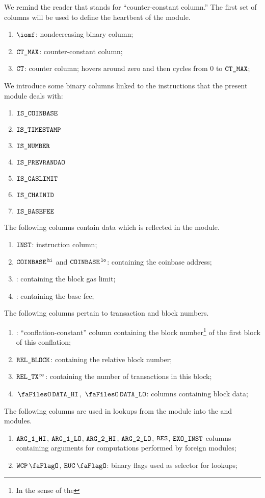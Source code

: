 We remind the reader that \ccc{} stands for ``counter-constant column.''
The first set of columns will be used to define the heartbeat of the \btcMod{} module.
\begin{enumerate}
	\item $\iomf$:
		nondecreasing binary column;
	\item $\texttt{CT\_MAX}$:
		counter-constant column;
	\item $\texttt{CT}$:
		counter column; hovers around zero and then cycles from $0$ to $\texttt{CT\_MAX}$;
\end{enumerate}
We introduce some binary columns linked to the instructions that the present module deals with:
\begin{multicols}{3}
	\begin{enumerate}[resume]
		\item $\texttt{IS\_COINBASE}$
		\item $\texttt{IS\_TIMESTAMP}$
		\item $\texttt{IS\_NUMBER}$
		\item $\texttt{IS\_PREVRANDAO}$
		\item $\texttt{IS\_GASLIMIT}$
		\item $\texttt{IS\_CHAINID}$
		\item $\texttt{IS\_BASEFEE}$
	\end{enumerate}
\end{multicols}
\noindent The following columns contain data which is reflected in the \userTxnDataMod{} module.
\begin{enumerate}[resume, start=13]
	\item $\texttt{INST}$:
		instruction column;
	\item $\texttt{COINBASE}^{\mathtt{\,hi}}$ and $\texttt{COINBASE}^{\mathtt{\,lo}}$:
		\ccc{} containing the
		coinbase address;
	\item \blockGasLimit{}:
		\ccc{} containing the
		block gas limit;
	\item \basefee{}:
		\ccc{} containing the
		base fee;
\end{enumerate}
The following columns pertain to transaction and block numbers.
\begin{enumerate}[resume]
	\item \blockNumberOfFirstBlockInConflation{}:
		``conflation-constant'' column containing the block number\footnote{In the sense of the \evm{}} of the first block of this conflation;
	\item $\texttt{REL\_BLOCK}$:
		\ccc{} containing the relative block number;
	\item $\texttt{REL\_TX}^\infty$:
		\ccc{} containing the number of transactions in this block;
	\item $\blockDataHi$, $\blockDataLo$:
		columns containing block data;
\end{enumerate}
The following columns are used in lookups from the \btcMod{} module into the \wcpMod{} and \eucMod{} modules.
\begin{enumerate}[resume]
	\item $\texttt{ARG}\texttt{\_1}\texttt{\_HI}$, $\texttt{ARG}\texttt{\_1}\texttt{\_LO}$, $\texttt{ARG}\texttt{\_2}\texttt{\_HI}$, $\texttt{ARG}\texttt{\_2}\texttt{\_LO}$, $\texttt{RES}$, $\texttt{EXO\_}\texttt{INST}$
		columns containing arguments for computations performed by foreign modules;
	\item $\wcpFlag$, $\eucFlag$:
		binary flags used as selector for lookups;
\end{enumerate}

